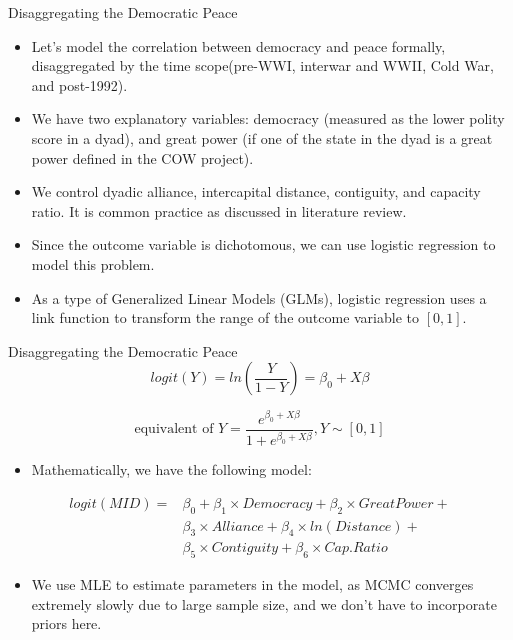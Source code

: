 \documentclass{beamer}
\begin{document}
	\begin{frame}{Disaggregating the Democratic Peace}
		\begin{itemize}
			\item Let's model the correlation between democracy and peace formally, disaggregated by the time scope(pre-WWI, interwar and WWII, Cold War, and post-1992).
			\item We have two explanatory variables: democracy (measured as the lower polity score in a dyad), and great power (if one of the state in the dyad is a great power defined in the COW project).
			\item We control dyadic alliance, intercapital distance, contiguity, and capacity ratio. It is common practice as discussed in literature review.
			\item Since the outcome variable is dichotomous, we can use logistic regression to model this problem.
			\item As a type of Generalized Linear Models (GLMs), logistic regression uses a link function to transform the range of the outcome variable to $[0,1]$.
		\end{itemize}
	\end{frame}

	\begin{frame}{Disaggregating the Democratic Peace}
		\begin{equation}
			logit(Y)=ln(\frac{Y}{1-Y})=\beta_0 + X\beta
		\end{equation}
		
		\begin{equation}
			\text{equivalent of }Y=\frac{e^{\beta_0 + X\beta}}{1+e^{\beta_0 + X\beta}},
			Y \sim [0,1]
		\end{equation}
	
		\begin{itemize}
			\item Mathematically, we have the following model:
		\end{itemize}
		
		\begin{equation}
			\begin{aligned}
				logit(MID) = & \beta_0  + \beta_1 \times Democracy + \beta_2 \times Great Power + \\
				             & \beta_3 \times Alliance + \beta_4 \times ln(Distance) + \\
				             & \beta_5 \times Contiguity + \beta_6 \times Cap. Ratio
			\end{aligned}
		\end{equation}
	
		\begin{itemize}
			\item We use MLE to estimate parameters in the model, as MCMC converges extremely slowly due to large sample size, and we don't have to incorporate priors here.
		\end{itemize}
	\end{frame}
\end{document}
